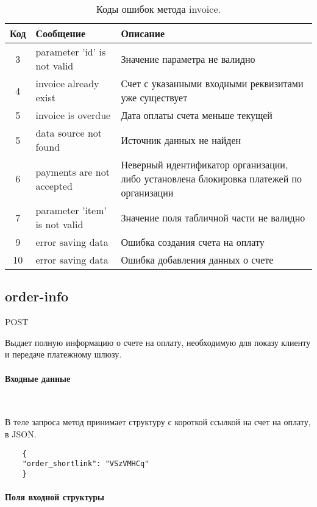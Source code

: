 \documentclass[11pt, a4paper]{article}
\begin{document}
\begin{table}[H]
	\centering
	
	\begin{tabular}{| c | p{6cm} | p{9cm} |}
		\hline
		Код & Сообщение & Описание \\
		\hline
		3 & parameter 'id' is not valid & Значение параметра не валидно \\
		4 & invoice already exist & Счет с указанными входными реквизитами уже существует\\
		5 & invoice is overdue & Дата оплаты счета меньше текущей \\
		5 & data source not found & Источник данных не найден \\
		6 & payments are not accepted & Неверный идентификатор организации, либо установлена блокировка платежей по организации \\
		7 & parameter 'item' is not valid & Значение поля табличной части не валидно \\
		9 & error saving data & Ошибка создания счета на оплату \\
		10 & error saving data & Ошибка добавления данных о счете \\
		\hline
	\end{tabular}
	\caption{Коды ошибок метода invoice.}
\end{table}

\subsection{order-info}
POST

Выдает полную информацию о счете на оплату, необходимую для показу клиенту и передаче платежному шлюзу.

\paragraph{Входные данные}\

В теле запроса метод принимает структуру с короткой ссылкой на счет на оплату, в JSON.

\begin{listing}[H]
	\begin{verbatim}
	{
	"order_shortlink": "VSzVMHCq"
	}
	\end{verbatim}
	\caption{Входной пакет метода order-info.} 
\end{listing}

\paragraph{Поля входной структуры}\
\end{document}
